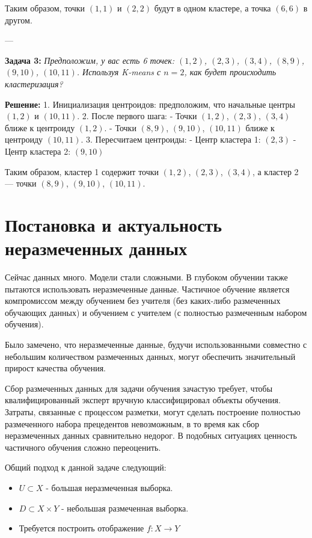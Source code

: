 Таким образом, точки $(1, 1)$ и $(2, 2)$ будут в одном кластере, а точка $(6, 6)$ в другом.

---

\textbf{Задача 3:} \textit{Предположим, у вас есть 6 точек: $(1, 2)$, $(2, 3)$, $(3, 4)$, $(8, 9)$, $(9, 10)$, $(10, 11)$. Используя K-means с $n=2$, как будет происходить кластеризация?}

\textbf{Решение:}  
1. Инициализация центроидов: предположим, что начальные центры $(1, 2)$ и $(10, 11)$.
2. После первого шага:
   - Точки $(1, 2)$, $(2, 3)$, $(3, 4)$ ближе к центроиду $(1, 2)$.
   - Точки $(8, 9)$, $(9, 10)$, $(10, 11)$ ближе к центроиду $(10, 11)$.
3. Пересчитаем центроиды:
   - Центр кластера 1: $(2, 3)$
   - Центр кластера 2: $(9, 10)$

Таким образом, кластер 1 содержит точки $(1, 2)$, $(2, 3)$, $(3, 4)$, а кластер 2 — точки $(8, 9)$, $(9, 10)$, $(10, 11)$.

\section*{Постановка и актуальность неразмеченных данных}
Сейчас данных много. Модели стали сложными. В глубоком обучении также пытаются использовать неразмеченные данные. Частичное обучение является компромиссом между обучением без учителя (без каких-либо размеченных обучающих данных) и обучением с учителем (с полностью размеченным набором обучения). \par 
Было замечено, что неразмеченные данные, будучи использованными совместно с небольшим количеством размеченных данных, могут обеспечить значительный прирост качества обучения. \par 
Сбор размеченных данных для задачи обучения зачастую требует, чтобы квалифицированный эксперт вручную классифицировал объекты обучения. Затраты, связанные с процессом разметки, могут сделать построение полностью размеченного набора прецедентов невозможным, в то время как сбор неразмеченных данных сравнительно недорог. В подобных ситуациях ценность частичного обучения сложно переоценить.

Общий подход к данной задаче следующий:
\begin{itemize}
    \item $U \subset X$ - большая неразмеченная выборка.
    \item $ D \subset X \times Y$ - небольшая размеченная выборка.
    \item Требуется построить отображение $f : X \rightarrow Y$
\end{itemize}
